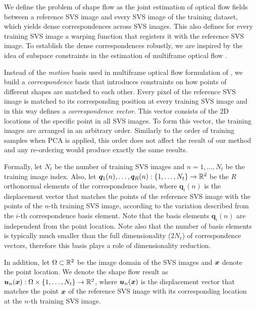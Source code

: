 We define the problem of shape flow as the joint estimation of optical flow fields between a reference SVS image and every SVS image of the training dataset, which yields dense correspondences across SVS images. This also defines for every training SVS image a warping function that registers it with the reference SVS image. To establish the dense correspondences robustly, we are inspired by the idea of subspace constraints in the estimation of multiframe optical flow \cite{Garg:2013hu,tomasi2012dense,snape15faceflow}.

Instead of the \emph{motion} basis used in multiframe optical flow formulation of \cite{Garg:2013hu}, we build a \emph{correspondence} basis that introduces constraints on how points of different shapes are matched to each other. Every pixel of the reference SVS image is matched to its corresponding position at every training SVS image and in this way defines a \emph{correspondence vector}. This vector consists of the 2D locations of the specific point in all SVS images. To form this vector, the training images are arranged in an arbitrary order. Similarly to the order of training samples when PCA is applied, this order does not affect the result of our method and any re-ordering would produce exactly the same results.


Formally, let $N_t$ be the number of training SVS images and $n=1,\ldots,N_t$ be the training image index. Also, let $\boldsymbol{q}_1(n),\ldots,\boldsymbol{q}_R(n):
\{1,\ldots,N_t\} \rightarrow \mathbb{R}^2$ be the $R$ orthonormal elements of the correspondence basis, where $\boldsymbol{q}_i(n)$ is the displacement vector that matches the points of the reference SVS image with the points of the $n$-th training SVS image, according to the variation described from the $i$-th correspondence basis element. Note that the basis elements $\boldsymbol{q}_i(n)$ are independent from the point location. Note also that the number of basis elements is typically much smaller than the full dimensionality ($2 N_t$) of correspondence vectors, therefore this basis plays a role of dimensionality reduction. 


In addition, let $\Omega \subset \mathbb{R}^2$ be the image domain of the SVS images and $\boldsymbol{x}$ denote the point location. We denote the shape flow result as $\bm{u}_n(\boldsymbol{x}):\Omega\times \{1,\ldots,N_t\}
\rightarrow \mathbb{R}^2$,  where $\bm{u}_n(\boldsymbol{x})$ is the displacement vector that matches the point $\boldsymbol{x}$ of the reference SVS image with its corresponding location at the $n$-th training SVS image.

